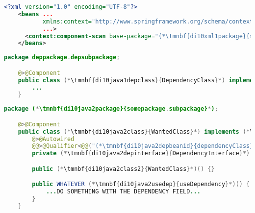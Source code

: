 \newpage

\begin{lstlisting}[language=XML, title={Configuration XML}]
    <?xml version="1.0" encoding="UTF-8"?>
    <beans ...
           xmlns:context="http://www.springframework.org/schema/context"
           ...>
      <context:component-scan base-package="(*\tmnbf{di10xml1package}{somepackage.subpackage}[ForestGreen]*)"/>
    </beans>
\end{lstlisting}
\begin{lstlisting}[language=Java, title={Dependency class}]
    package deppackage.depsubpackage;

    @>@Component
    public class (*\tmnbf{di10java1depclass}{DependencyClass}*) implements (*\tmnbf{di10java1depinterface}{DependencyInterface}*) {
        ...
    }
\end{lstlisting}
\begin{lstlisting}[language=Java, title={Wanted class with the zero--parameter constructor}]
    package (*\tmnbf{di10java2package}{somepackage.subpackage}*);

    @>@Component
    public class (*\tmnbf{di10java2class}{WantedClass}*) implements (*\tmnbf{di10java2interface}{WantedClassInterface}*) {
        @>@Autowired
        @@>@Qualifier<@@("(*\tmnbf{di10java2depbeanid}{dependencyClass}[ForestGreen]*)")
        private (*\tmnbf{di10java2depinterface}{DependencyInterface}*) dependencyField;

        public (*\tmnbf{di10java2class2}{WantedClass}*)() {}

        public WHATEVER (*\tmnbf{di10java2usedep}{useDependency}*)() {
            ...DO SOMETHING WITH THE DEPENDENCY FIELD...
        }
    }
\end{lstlisting}

